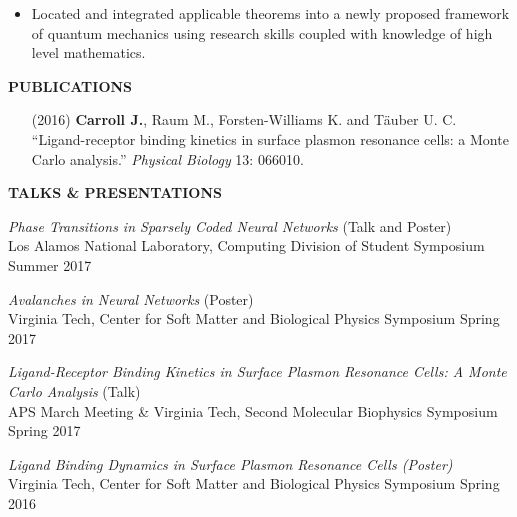 \documentclass[10pt]{letter}
\begin{document}
\begin{itemize} %
\item Located and integrated applicable theorems into a newly proposed framework of quantum mechanics using research skills coupled with knowledge of high level mathematics.
\end{itemize}

\vspace{.5cm}


 

{\bf PUBLICATIONS}

\begin{itemize}[leftmargin=1.1cm] %
\item[(2016)]  {\bf Carroll J.}, Raum M., Forsten-Williams K. and T\"{a}uber U. C. ``Ligand-receptor binding kinetics in surface plasmon resonance cells: a Monte Carlo analysis.'' {\it Physical Biology} 13: 066010.
\end{itemize}


\vspace{.5cm}



{\bf TALKS \& PRESENTATIONS}

 {\sl Phase Transitions in Sparsely Coded Neural Networks} (Talk and Poster) \\
Los Alamos National Laboratory, Computing Division of Student Symposium \hfill Summer 2017


 {\sl Avalanches in Neural Networks} (Poster)\\
Virginia Tech, Center for Soft Matter and Biological Physics Symposium \hfill Spring 2017

 {\sl Ligand-Receptor Binding Kinetics in Surface Plasmon Resonance Cells: A Monte Carlo Analysis} (Talk)\\
APS March Meeting \& Virginia Tech, Second Molecular Biophysics Symposium \hfill Spring 2017

 {\sl Ligand Binding Dynamics in Surface Plasmon Resonance Cells (Poster)}\\  
Virginia Tech, Center for Soft Matter and Biological Physics Symposium  \hfill Spring 2016
\end{document}
